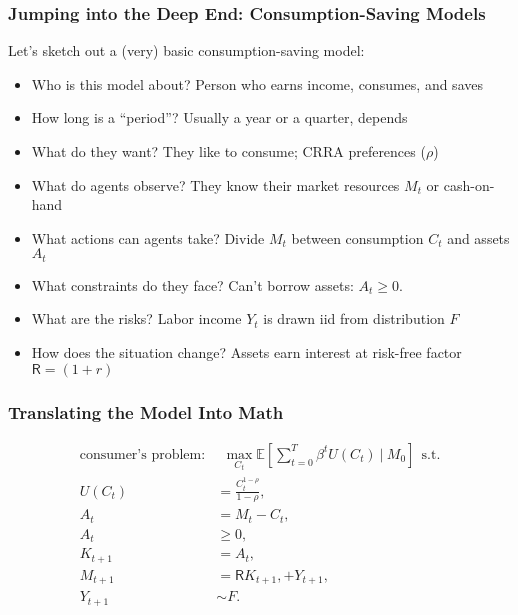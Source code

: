 \documentclass[aspectratio=169]{beamer}
\newcommand{\E}{\mathbb{E}}
\begin{document}

\begin{frame}
\frametitle{Jumping into the Deep End: Consumption-Saving Models}

Let's sketch out a (very) basic consumption-saving model:
\begin{itemize}
	\item Who is this model about? Person who earns income, consumes, and saves
	
	\item How long is a ``period''? Usually a year or a quarter, depends
	
	\item What do they want? They like to consume; CRRA preferences ($\rho$)
	
	\item What do agents observe? They know their market resources $M_t$ or cash-on-hand
	
	\item What actions can agents take? Divide $M_t$ between consumption $C_t$ and assets $A_t$
	
	\item What constraints do they face? Can't borrow assets: $A_t \geq 0$.
	
	\item What are the risks? Labor income $Y_t$ is drawn iid from distribution $F$
	
	\item How does the situation change? Assets earn interest at risk-free factor $\mathsf{R} = (1+r)$
\end{itemize}

\end{frame}


\begin{frame}
\frametitle{Translating the Model Into Math}

\begin{align*}
\text{consumer's problem:} & ~~ \max_{C_t} \E \left[ \sum_{t=0}^T \beta^t U(C_t) ~\bigg|~ M_0 \right] ~~\text{s.t.} \\
U(C_t) &= \frac{C_t^{1-\rho}}{1-\rho}, \\
A_t &= M_t - C_t, \\
A_t &\geq 0, \\
K_{t+1} &= A_t, \\
M_{t+1} &= \mathsf{R} K_{t+1}, + Y_{t+1}, \\
Y_{t+1} &\sim F.
\end{align*}
\end{frame}
\end{document}
